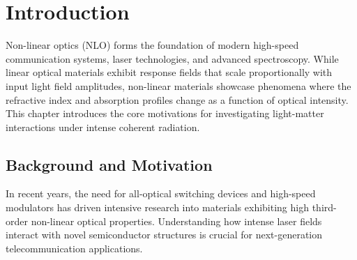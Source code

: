 %
%
%

\chapter{Introduction}
\label{ch:introduction}

Non-linear optics (NLO) forms the foundation of modern high-speed communication systems, laser technologies, and advanced spectroscopy. While linear optical materials exhibit response fields that scale proportionally with input light field amplitudes, non-linear materials showcase phenomena where the refractive index and absorption profiles change as a function of optical intensity. This chapter introduces the core motivations for investigating light-matter interactions under intense coherent radiation.

\section{Background and Motivation}
In recent years, the need for all-optical switching devices and high-speed modulators has driven intensive research into materials exhibiting high third-order non-linear optical properties. Understanding how intense laser fields interact with novel semiconductor structures is crucial for next-generation telecommunication applications.

